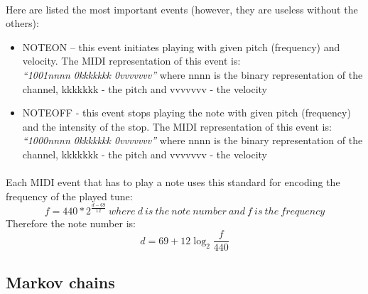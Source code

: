 \documentclass[]{article}
\begin{document}
            \paragraph{}Here are listed the most important events (however, they are useless without the others):
            \begin{itemize}
                \item NOTEON -- this event initiates playing with given pitch (frequency) and velocity. The MIDI representation of this event is:\\
                    \textit{``1001nnnn 0kkkkkkk 0vvvvvvv''} where nnnn is the binary representation of the channel, kkkkkkk - the pitch and vvvvvvv - the velocity
                \item NOTEOFF - this event stops playing the note with given pitch (frequency) and the intensity of the stop. The MIDI representation of this event is:\\
                    \textit{``1000nnnn 0kkkkkkk 0vvvvvvv''} where nnnn is the binary representation of the channel, kkkkkkk - the pitch and vvvvvvv - the velocity
            \end{itemize}
            \paragraph{} Each MIDI event that has to play a note uses this standard for encoding the frequency of the played tune\cite{midifreq}:
            $$f = 440 * 2^\frac{d - 69}{12}\ where\ d\ is\ the\ note\ number\ and\ f\ is\ the\ frequency$$
            Therefore the note number is:
            $$d = 69 + 12\log_2 \frac{f}{440}$$
        \subsection{Markov chains}
\end{document}
